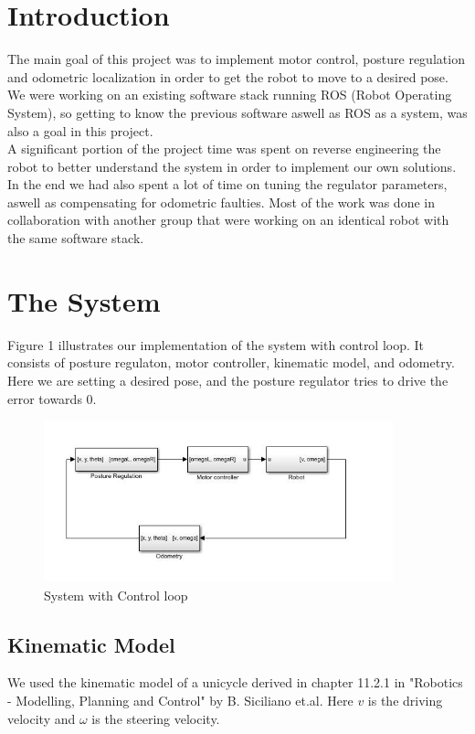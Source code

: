 \documentclass[a4paper,10pt]{article}
\begin{document}
\section{Introduction}
The main goal of this project was to implement motor control, posture regulation and odometric localization in order to get the robot to move to a desired pose. We were working on an existing software stack running ROS (Robot Operating System), so getting to know the previous software aswell as ROS as a system, was also a goal in this project.\\
A significant portion of the project time was spent on reverse engineering the robot to better understand the system in order to implement our own solutions. In the end we had also spent a lot of time on tuning the regulator parameters, aswell as compensating for odometric faulties. Most of the work was done in collaboration with another group that were working on an identical robot with the same software stack. \\

\section{The System}
Figure 1 illustrates our implementation of the system with control loop. It consists of posture regulaton, motor controller, kinematic model, and odometry. Here we are setting a desired pose, and the posture regulator tries to drive the error towards 0.

	\begin{figure}[H]
	\centering
	\includegraphics[width=0.9\textwidth]{blokkskjema.JPG}
	\caption{System with Control loop}	
 	\label{fig:2}
	\end{figure}

\subsection{Kinematic Model}
We used the kinematic model of a unicycle derived in chapter 11.2.1 in "Robotics - Modelling, Planning and Control" by B. Siciliano et.al. Here $v$ is the driving velocity and $\omega$ is the steering velocity.
\end{document}
